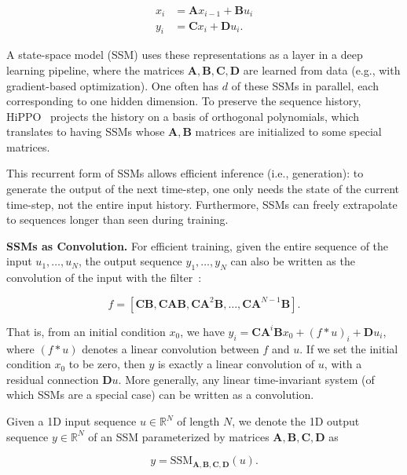 \begin{align*}
  x_i &= \mathbf{A} x_{i-1} + \mathbf{B} u_i \\
  y_i &= \mathbf{C} x_i + \mathbf{D} u_i.
\end{align*}

A state-space model (SSM) uses these representations as a layer in a deep learning pipeline, where the matrices $\mathbf{A}, \mathbf{B}, \mathbf{C}, \mathbf{D}$ are learned from data (e.g., with gradient-based optimization). One often has $d$ of these SSMs in parallel, each corresponding to one hidden dimension. To preserve the sequence history, HiPPO~\citep{gu2020hippo} projects the history on a basis of orthogonal polynomials, which translates to having SSMs whose
$\mathbf{A}, \mathbf{B}$ matrices are initialized to some special matrices.

This recurrent form of SSMs allows efficient inference (i.e., generation): to generate the output of the next time-step, one only needs the state of the current time-step, not the entire input history. Furthermore, SSMs can freely extrapolate to sequences longer than seen during training.

\textbf{SSMs as Convolution.} For efficient training, given the entire sequence of the input $u_1, \dots, u_N$, the output sequence $y_1, \dots, y_N$ can also be written as the convolution of the input with the filter~\citep{gu2021combining}:

\begin{equation*}
  f = [\mathbf{C} \mathbf{B}, \mathbf{C}\mathbf{A}\mathbf{B}, \mathbf{C}\mathbf{A}^2\mathbf{B}, \dots, \mathbf{C}\mathbf{A}^{N-1}\mathbf{B}].
\end{equation*}

That is, from an initial condition $x_0$, we have $y_i = \mathbf{C}\mathbf{A}^i\mathbf{B} x_0 + (f \ast u)_i + \mathbf{D} u_i$, where $(f \ast u)$ denotes a linear convolution between $f$ and $u$. If we set the initial condition $x_0$ to be zero, then $y$ is exactly a linear convolution of $u$, with a residual connection $\mathbf{D} u$. More generally, any linear time-invariant system (of which SSMs are a special case) can be written as a convolution.

Given a 1D input sequence $u \in \mathbb{R}^{N}$ of length $N$, we denote the 1D output sequence $y \in \mathbb{R}^N$ of an SSM parameterized by matrices $\mathbf{A}, \mathbf{B}, \mathbf{C}, \mathbf{D}$ as

\begin{equation*}
  y = \mathrm{SSM}_{\mathbf{A}, \mathbf{B}, \mathbf{C}, \mathbf{D}}(u).
\end{equation*}

